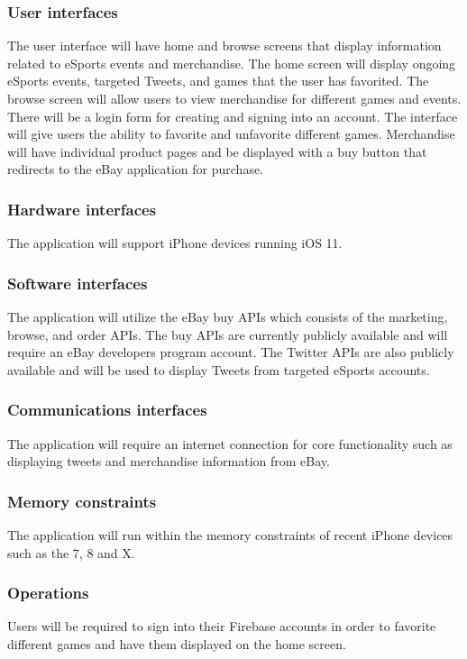 \documentclass[onecolumn, draftclsnofoot,10pt, compsoc]{IEEEtran}
\begin{document}
\subsubsection{User interfaces}
The user interface will have home and browse screens that display information related to eSports events and merchandise. The home screen will display ongoing eSports events, targeted Tweets, and games that the user has favorited. The browse screen will allow users to view merchandise for different games and events. There will be a login form for creating and signing into an account. The interface will give users the ability to favorite and unfavorite different games. Merchandise will have individual product pages and be displayed with a buy button that redirects to the eBay application for purchase.

\subsubsection{Hardware interfaces}
The application will support iPhone devices running iOS 11.

\subsubsection{Software interfaces}
The application will utilize the eBay buy APIs which consists of the marketing, browse, and order APIs. The buy APIs are currently publicly available and will require an eBay developers program account. The Twitter APIs are also publicly available and will be used to display Tweets from targeted eSports accounts.

\subsubsection{Communications interfaces}
The application will require an internet connection for core functionality such as displaying tweets and merchandise information from eBay.

\subsubsection{Memory constraints}
The application will run within the memory constraints of recent iPhone devices such as the 7, 8 and X.

\subsubsection{Operations}
Users will be required to sign into their Firebase accounts in order to favorite different games and have them displayed on the home screen. 
\end{document}

